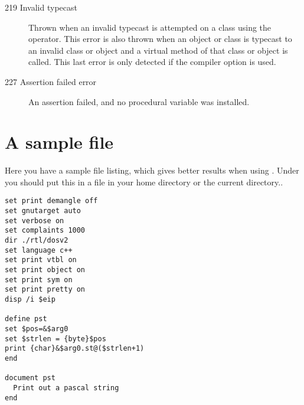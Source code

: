\begin{description}
\item [219 Invalid typecast]

Thrown when an invalid typecast is attempted on a class using the 
operator. This error is also thrown when an object or class is
typecast to an invalid class or object and a virtual method of
that class or object is called. This last error is only detected
if the  compiler option is used.

\item [227 Assertion failed error]
An assertion failed, and no  procedural variable was 
installed.
\end{description}



\chapter{A sample  file}
\label{ch:GdbIniFile}

Here you have a sample  file listing, which gives better
results when using . Under \linux you should put this in a
 file in your home directory or the current directory..

\begin{verbatim}
set print demangle off
set gnutarget auto
set verbose on
set complaints 1000
dir ./rtl/dosv2
set language c++
set print vtbl on
set print object on
set print sym on
set print pretty on
disp /i $eip

define pst
set $pos=&$arg0
set $strlen = {byte}$pos
print {char}&$arg0.st@($strlen+1)
end

document pst
  Print out a pascal string
end
\end{verbatim}




